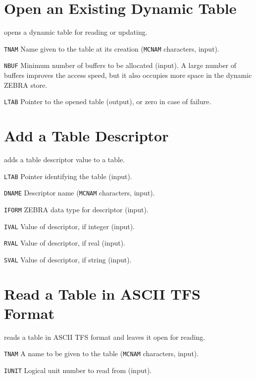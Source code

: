 \section{Open an Existing Dynamic Table}
\label{TBOPEN}
opens a dynamic table for reading or updating.
\begin{mylist}
\item[\tt TNAM]
Name given to the table at its creation ({\tt MCNAM} characters, input).
\item[\tt NBUF]
Minimum number of buffers to be allocated (input).
A large number of buffers improves the access speed,
but it also occupies more space in the dynamic ZEBRA store.
\item[\tt LTAB]
Pointer to the opened table (output), or zero in case of failure.
\end{mylist}

\section{Add a Table Descriptor}
\label{TBPDSC}
adds a table descriptor value to a table.
\begin{mylist}
\item[\tt LTAB]
Pointer identifying the table (input).
\item[\tt DNAME]
Descriptor name ({\tt MCNAM} characters, input).
\item[\tt IFORM]
ZEBRA data type for descriptor (input).
\item[\tt IVAL]
Value of descriptor, if integer (input).
\item[\tt RVAL]
Value of descriptor, if real (input).
\item[\tt SVAL]
Value of descriptor, if string (input).
\end{mylist}

\section{Read a Table in ASCII TFS Format}
\label{TBRTFS}
reads a table in ASCII TFS format and leaves it open for reading.
\begin{mylist}
\item[\tt TNAM]
A name to be given to the table ({\tt MCNAM} characters, input).
\item[\tt IUNIT]
Logical unit number to read from (input).
\end{mylist}

